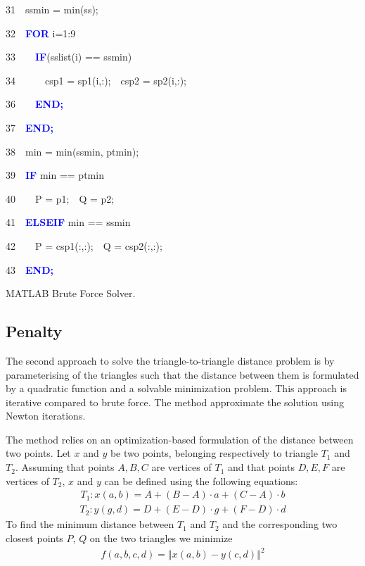 \documentclass[times,12pt]{article}
\begin{document}
\begin{algorithm}
31~~ssmin = min(ss);

32~~\textbf{\textcolor{blue}{FOR}} i=1:9

33~~~~\textbf{\textcolor{blue}{IF}}(sslist(i) == ssmin)

34~~~~~~csp1 = sp1(i,:);~~csp2 = sp2(i,:);

36~~~~\textbf{\textcolor{blue}{END;}}

37~~\textbf{\textcolor{blue}{END;}}

38~~min = min(ssmin, ptmin);

39~~\textbf{\textcolor{blue}{IF}} min == ptmin

40~~~~P = p1;~~Q = p2;

41~~\textbf{\textcolor{blue}{ELSEIF}} min == ssmin

42~~~~P = csp1(:,:);~~Q = csp2(:,:);

43~~\textbf{\textcolor{blue}{END;}}
\protect\caption{\label{alg3}MATLAB Brute Force Solver.}
\end{algorithm}
\clearpage

\subsection{Penalty}

The second approach to solve the triangle-to-triangle  distance problem is by parameterising of the triangles such that the distance between them is formulated by a quadratic function and a solvable minimization problem. This approach is iterative compared to brute force. The method approximate the solution using Newton iterations.

The method relies on an optimization-based formulation of the distance between two points. Let $x$ and $y$ be two points, belonging respectively to triangle $T_1$ and $T_2$. Assuming that points $A, B, C$ are vertices of $T_1$ and that points $D, E, F$ are vertices of $T_2$, $x$ and $y$ can be defined using the following equations: 
\begin{align*}
T_{1}:x(a,b)=A+(B-A) \cdot a+(C-A)\cdot b
\end{align*}
\begin{align*}
T_{2}:y(g,d)=D+(E-D) \cdot g+(F-D) \cdot d
\end{align*} 
To find the minimum distance between $T_1$ and $T_2$ and the corresponding two closest points $P$, $Q$ on the two triangles we minimize
\begin{align*}
f\left(a,b,c,d\right)=\left\Vert x\left(a,b\right)-y\left(c,d\right)\right\Vert ^{2}
\end{align*} 
\end{document}
